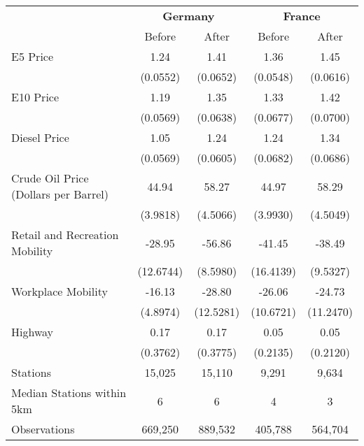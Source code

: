 \begin{tabular}{l*{4}{c}}
\toprule
                    &\multicolumn{2}{c}{\textbf{Germany}}&\multicolumn{2}{c}{\textbf{France}}\\\cmidrule(lr){2-3}\cmidrule(lr){4-5}
                    &\multicolumn{1}{c}{Before}&\multicolumn{1}{c}{After}&\multicolumn{1}{c}{Before}&\multicolumn{1}{c}{After}\\
\midrule
E5 Price            &        1.24&        1.41&        1.36&        1.45\\
                    &    (0.0552)&    (0.0652)&    (0.0548)&    (0.0616)\\
E10 Price           &        1.19&        1.35&        1.33&        1.42\\
                    &    (0.0569)&    (0.0638)&    (0.0677)&    (0.0700)\\
Diesel Price        &        1.05&        1.24&        1.24&        1.34\\
                    &    (0.0569)&    (0.0605)&    (0.0682)&    (0.0686)\\
Crude Oil Price (Dollars per Barrel)&       44.94&       58.27&       44.97&       58.29\\
                    &    (3.9818)&    (4.5066)&    (3.9930)&    (4.5049)\\
Retail and Recreation Mobility&      -28.95&      -56.86&      -41.45&      -38.49\\
                    &   (12.6744)&    (8.5980)&   (16.4139)&    (9.5327)\\
Workplace Mobility  &      -16.13&      -28.80&      -26.06&      -24.73\\
                    &    (4.8974)&   (12.5281)&   (10.6721)&   (11.2470)\\
Highway             &        0.17&        0.17&        0.05&        0.05\\
                    &    (0.3762)&    (0.3775)&    (0.2135)&    (0.2120)\\
\midrule
Stations            &      15,025&      15,110&       9,291&       9,634\\
Median Stations within 5km&           6&           6&           4&           3\\
Observations        &     669,250&     889,532&     405,788&     564,704\\
\bottomrule
\end{tabular}
